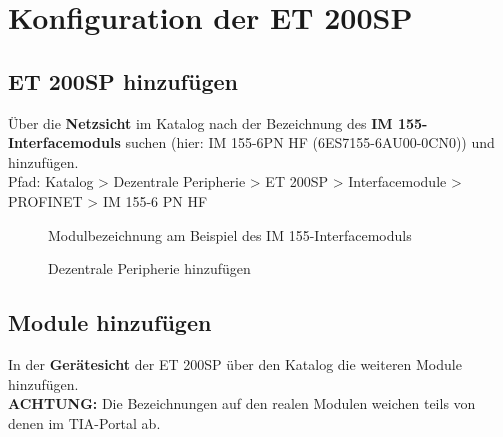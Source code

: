 \section{Konfiguration der ET 200SP} \label{sec:Konfiguration_der_ET_200_SP}

\subsection{ET 200SP hinzufügen}
Über die \textbf{Netzsicht} im Katalog nach der Bezeichnung des \textbf{IM 155-Interfacemoduls} suchen (hier: IM 155-6PN HF (6ES7155-6AU00-0CN0)) und hinzufügen.\\
Pfad: Katalog > Dezentrale Peripherie > ET 200SP > Interfacemodule > PROFINET > IM 155-6 PN HF

\begin{figure}[H]
    \centering
   \begin{minipage}[b]{.4\linewidth}
        \centering
        \caption[Modulbezeichnung am Beispiel des IM 155-Interfacemoduls]{Modulbezeichnung am Beispiel des IM 155-Interfacemoduls}
        \label{fig:Bild4.1}
   \end{minipage}
   \hspace{.1\linewidth}%
   \begin{minipage}[b]{.4\linewidth}
        \centering
        \caption[Dezentrale Peripherie hinzufügen]{Dezentrale Peripherie hinzufügen\\}
        \label{fig:Bild4.2}
   \end{minipage}
\end{figure}

\clearpage

\subsection{Module hinzufügen}
In der \textbf{Gerätesicht} der ET 200SP über den Katalog die weiteren Module hinzufügen.\\
\textbf{ACHTUNG:} Die Bezeichnungen auf den realen Modulen weichen teils von denen im TIA-Portal ab.

